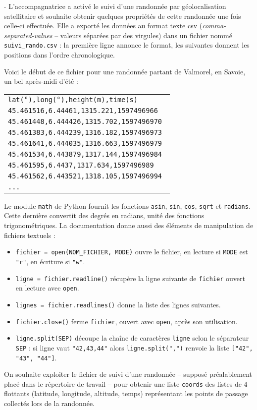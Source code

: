 \documentclass[11pt,a4paper]{article}
\begin{document}
\begin{Exercise}[title={Randonnée},origin={\bac \; d'après {\sc ccmp 2021 - pc, pc psi} (Partie 1)}]
\medskip 
\leftskip -\QuestionIndent
L'accompagnatrice a activé le suivi d'une randonnée par géolocalisation satellitaire et souhaite obtenir quelques propriétés de cette randonnée une fois celle-ci effectuée. Elle a exporté les données au format texte {\sc csv} (\textit{comma-separated-values} -- valeurs séparées par des virgules) dans un fichier nommé {\tt suivi\_rando.csv} : la première ligne annonce le format, les suivantes donnent les positions dans l'ordre chronologique.

Voici le début de ce fichier pour une randonnée partant de Valmorel, en Savoie, un bel après-midi d'été :

\begin{center}
	\begin{tabular}{>{\tt}l}
lat(°),long(°),height(m),time(s) \\
45.461516,6.44461,1315.221,1597496966 \\
45.461448,6.444426,1315.702,1597496970 \\
45.461383,6.444239,1316.182,1597496973  \\
45.461641,6.444035,1316.663,1597496979 \\
45.461534,6.443879,1317.144,1597496984 \\
45.461595,6.4437,1317.634,1597496989 \\
45.461562,6.443521,1318.105,1597496994 \\
... \\
	\end{tabular}
\end{center}

Le module {\tt math} de Python fournit les fonctions {\tt asin}, {\tt sin}, {\tt cos}, {\tt sqrt} et {\tt radians}. Cette dernière convertit des degrés en radians, unité des fonctions trigonométriques. La documentation donne aussi des éléments de manipulation de fichiers textuels :
\begin{itemize}
	\item {\tt fichier = open(NOM\_FICHIER, MODE)} ouvre le fichier, en lecture si {\tt MODE} est {\tt "r"}, en écriture si {\tt "w"}.
	\item {\tt ligne = fichier.readline()} récupère la ligne suivante de {\tt fichier} ouvert en lecture avec {\tt open}.
	\item {\tt lignes = fichier.readlines()} donne la liste des lignes suivantes.
	\item {\tt fichier.close()} ferme {\tt fichier}, ouvert avec {\tt open}, après son utilisation.
	\item {\tt ligne.split(SEP)} découpe la chaîne de caractères {\tt ligne} selon le séparateur {\tt SEP} : si ligne vaut {\tt "42,43,44"} alors {\tt ligne.split(",")} renvoie la liste {\tt ["42", "43", "44"]}.
\end{itemize}
On souhaite exploiter le fichier de suivi d'une randonnée -- supposé préalablement placé dans le répertoire de travail -- pour obtenir une liste {\tt coords} des listes de 4 flottants (latitude, longitude, altitude, temps) représentant les points de passage collectés lors de la randonnée.


\end{Exercise}
\end{document}
